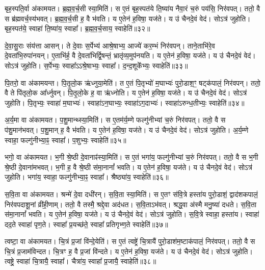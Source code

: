 बृह॒स्पति॒र्वा अ॑कामयत।
ब्र॒ह्म॒व॒र्च॒सी स्या॒मिति॑।
स ए॒तं बृह॒स्पत॑ये ति॒ष्या॑य नैवा॒रं च॒रुं पय॑सि॒ निर॑वपत्।
ततो॒ वै स ब्र॑ह्म\-वर्च॒स्य॑भवत्।
ब्र॒ह्म॒व॒र्च॒सी ह॒ वै भ॑वति।
य ए॒तेन॑ ह॒विषा॒ यज॑ते।
य उ॑ चैनदे॒वं वेद॑।
सोऽत्र॑ जुहोति।
बृह॒स्पत॑ये॒ स्वाहा॑ ति॒ष्या॑य॒ स्वाहा᳚।
ब्र॒ह्म॒व॒र्च॒साय॒ स्वाहेति॑॥३२॥\ip

दे॒वा॒सु॒राः संय॑त्ता आसन्।
ते दे॒वाः स॒र्पेभ्य॑ आश्रे॒षाभ्य॒ आज्ये॑ कर॒म्भं निर॑वपन्।
ताने॒ताभि॑रे॒व दे॒वता॑भि॒रुपा॑नयन्।
ए॒ताभि॑र्ह॒ वै दे॒वता॑भिर्द्वि॒षन्तं॒ भ्रातृ॑व्य॒मुप॑नयति।
य ए॒तेन॑ ह॒विषा॒ यज॑ते।
य उ॑ चैनदे॒वं वेद॑।
सोऽत्र॑ जुहोति।
स॒र्पेभ्यः॒ स्वाहा᳚\-ऽऽश्रे॒षाभ्यः॒ स्वाहा᳚।
द॒न्द॒शूके᳚भ्यः॒ स्वाहेति॑॥३३॥\ip

पि॒तरो॒ वा अ॑कामयन्त।
पि॒तृ॒लो॒क ऋ॑ध्नुया॒मेति॑।
त ए॒तं पि॒तृभ्यो॑ म॒घाभ्यः॑ पुरो॒डाश॒ꣳ॒ षट्क॑पालं॒ निर॑वपन्।
ततो॒ वै ते पि॑तृलो॒क आ᳚र्ध्नुवन्।
पि॒तृ॒लो॒के ह॒ वा ऋ॑ध्नोति।
य ए॒तेन॑ ह॒विषा॒ यज॑ते।
य उ॑ चैनदे॒वं वेद॑।
सोऽत्र॑ जुहोति।
पि॒तृभ्यः॒ स्वाहा॑ म॒घाभ्यः॑।
स्वाहा॑\-ऽन॒घाभ्यः॒ स्वाहा॑ऽग॒दाभ्यः॑।
स्वाहा॑\-ऽरुन्ध॒तीभ्यः॒ स्वाहेति॑॥३४॥\ip

अ॒र्य॒मा वा अ॑कामयत।
प॒शु॒मान्थ्स्या॒मिति॑।
स ए॒तम॑र्य॒म्णे फल्गु॑नीभ्यां च॒रुं निर॑वपत्।
ततो॒ वै स प॑शु॒मान॑भवत्।
प॒शु॒मान् ह॒ वै भ॑वति।
य ए॒तेन॑ ह॒विषा॒ यज॑ते।
य उ॑ चैनदे॒वं वेद॑।
सोऽत्र॑ जुहोति।
अ॒र्य॒म्णे स्वाहा॒ फल्गु॑नीभ्या॒ꣴ॒ स्वाहा᳚।
प॒शुभ्यः॒ स्वाहेति॑॥३५॥\ip

भगो॒ वा अ॑कामयत।
भ॒गी श्रे॒ष्ठी दे॒वानाꣴ॑स्या॒मिति॑।
स ए॒तं भगा॑य॒ फल्गु॑नीभ्यां च॒रुं निर॑वपत्।
ततो॒ वै स भ॒गी श्रे॒ष्ठी दे॒वाना॑मभवत्।
भ॒गी ह॒ वै श्रे॒ष्ठी स॑मा॒नानां᳚ भवति।
य ए॒तेन॑ ह॒विषा॒ यज॑ते।
य उ॑ चैनदे॒वं वेद॑।
सोऽत्र॑ जुहोति।
भगा॑य॒ स्वाहा॒ फल्गु॑नीभ्या॒ꣴ॒ स्वाहा᳚।
श्रैष्ठ्या॑य॒ स्वाहेति॑॥३६॥\ip

स॒वि॒ता वा अ॑कामयत।
श्रन्मे॑ दे॒वा दधी॑रन्।
स॒वि॒ता स्या॒मिति॑।
स ए॒तꣳ स॑वि॒त्रे हस्ता॑य पुरो॒डाशं॒ द्वाद॑शकपालं॒ निर॑वपदाशू॒नां व्री॑ही॒णाम्।
ततो॒ वै तस्मै॒ श्रद्दे॒वा अद॑धत।
स॒वि॒ता\-ऽभ॑वत्।
श्रद्ध॒वा अ॑स्मै मनु॒ष्या॑ दधते।
स॒वि॒ता स॑मा॒नानां᳚ भवति।
य ए॒तेन॑ ह॒विषा॒ यज॑ते।
य उ॑ चैनदे॒वं वेद॑।
सोऽत्र॑ जुहोति।
स॒वि॒त्रे स्वाहा॒ हस्ता॑य।
स्वाहा॑ दद॒ते स्वाहा॑ पृण॒ते।
स्वाहा᳚ प्र॒यच्छ॑ते॒ स्वाहा᳚ प्रति\-गृभ्ण॒ते स्वाहेति॑॥३७॥\ip

त्वष्टा॒ वा अ॑कामयत।
चि॒त्रं प्र॒जां वि॑न्दे॒येति॑।
स ए॒तं त्वष्ट्रे॑ चि॒त्रायै॑ पुरो॒डाश॑म॒ष्टा\-क॑पालं॒ निर॑वपत्।
ततो॒ वै स चि॒त्रं प्र॒जाम॑विन्दत।
चि॒त्रꣳ ह॒ वै प्र॒जां वि॑न्दते।
य ए॒तेन॑ ह॒विषा॒ यज॑ते।
य उ॑ चैनदे॒वं वेद॑।
सोऽत्र॑ जुहोति।
त्वष्ट्रे॒ स्वाहा॑ चि॒त्रायै॒ स्वाहा᳚।
चैत्रा॑य॒ स्वाहा᳚ प्र॒जायै॒ स्वाहेति॑॥३८॥\ip

